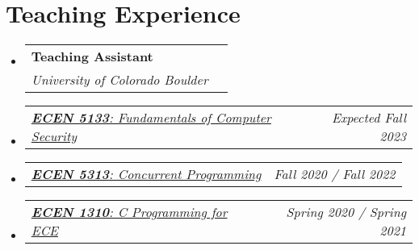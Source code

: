 \documentclass[letterpaper,11pt]{article}
\makeatletter
\newcommand{\resumeSubheading}[4]{
  \vspace{-2pt}\item
    \begin{tabular*}{0.97\textwidth}[t]{l@{\extracolsep{\fill}}r}
      \textbf{#1} & #2 \\
      \textit{\small#3} & \textit{\small #4} \\
    \end{tabular*}\vspace{-7pt}
}
\newcommand{\resumeSubSubheading}[2]{
    \item
    \begin{tabular*}{0.97\textwidth}{l@{\extracolsep{\fill}}r}
      \textit{\small#1} & \textit{\small #2} \\
    \end{tabular*}\vspace{-7pt}
}
\newcommand{\resumeSubHeadingListStart}{\begin{itemize}[leftmargin=0.15in, label={}]}
\newcommand{\resumeSubHeadingListEnd}{\end{itemize}}
\makeatother
\begin{document}
\section{Teaching Experience}
\resumeSubHeadingListStart
\resumeSubheading
{Teaching Assistant}{}
{University of Colorado Boulder}{}
\resumeSubSubheading
{\href{https://experts.colorado.edu/display/coursename_ECEN-5133}{\textbf{ECEN 5133}: Fundamentals of Computer Security}}{Expected Fall 2023}
\resumeSubSubheading
{\href{https://experts.colorado.edu/display/coursename_ECEN-5313}{\textbf{ECEN 5313}: Concurrent Programming}}{Fall 2020 / Fall 2022}
\resumeSubSubheading
{\href{https://experts.colorado.edu/display/coursename_ECEN-1310}{\textbf{ECEN 1310}: C Programming for ECE}}{Spring 2020 / Spring 2021}\resumeSubHeadingListEnd
\vspace{1pt}
\end{document}
